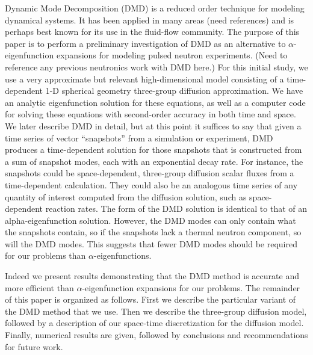 \documentclass[12pt]{article}
\begin{document}
Dynamic Mode Decomposition (DMD) is a reduced order technique for modeling dynamical systems.  It has been applied 
in many areas (need references) and is perhaps best known for its use in the fluid-flow community.  The purpose of 
this paper is to perform a preliminary investigation of DMD as an alternative to $\alpha$-eigenfunction expansions 
for modeling pulsed neutron experiments. (Need to reference any previous neutronics work with DMD here.) 
For this initial study, we use a very approximate but relevant 
high-dimensional model consisting of a time-dependent 1-D spherical geometry three-group diffusion approximation. 
We have an analytic eigenfunction solution for these equations, as well as a computer code for solving 
these equations with second-order accuracy in both time and space.  We later describe DMD in detail, but at 
this point it suffices to say that given a time series of vector ``snapshots'' from a simulation or experiment, 
DMD produces a time-dependent solution for those snapshots that is constructed from a sum of snapshot modes, each with 
an exponential decay rate.  For instance, the snapshots could be space-dependent, three-group diffusion scalar fluxes 
from a time-dependent calculation.  They could also be an analogous time series of any quantity of interest computed 
from the diffusion solution, such as space-dependent reaction rates.  The form of the DMD solution is identical to that 
of an alpha-eigenfunction solution.  However, the DMD modes can only contain what the snapshots contain, so if the snapshots 
lack a thermal neutron component, so will the DMD modes.  This suggests that fewer DMD modes should be required for 
our problems than $\alpha$-eigenfunctions.

Indeed we present results demonstrating that the DMD method is accurate and more efficient than 
$\alpha$-eigenfunction expansions for our problems.  The remainder of this paper is organized as follows.  First we describe 
the particular variant of the DMD method that we use.  Then we describe the three-group diffusion model, followed by a 
description of our space-time discretization for the diffusion model.  Finally, numerical results are given, followed by 
conclusions and recommendations for future work.
\end{document}
